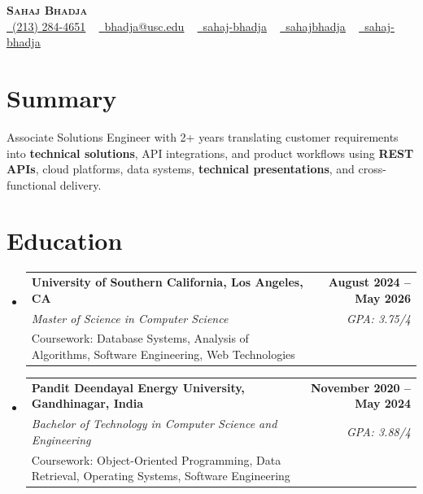 \documentclass[letterpaper,10pt]{article}
\makeatletter
\newcommand{\sectionGap}{\vspace{-8pt}}
\newcommand{\resumeEduSubheading}[5]{\vspace{-1pt}\item\begin{tabular*}{1.0\textwidth}[t]{l@{\extracolsep{\fill}}r}\textbf{#1} & \textbf{\small #2} \\\textit{\small #3} & \textit{\small #4} \\\small #5 & \\\end{tabular*}\vspace{-4pt}}
\newcommand{\resumeSubHeadingListStart}{\begin{itemize}[leftmargin=0.0in, label={}]}
\newcommand{\resumeSubHeadingListEnd}{\end{itemize}}
\makeatother
\begin{document}
\begin{center}
{\Huge \scshape \textbf{Sahaj Bhadja}} \\ \vspace{1pt}
\small \href{tel:2132844651}{\faPhone\ \underline{(213) 284-4651}} ~ \href{mailto:bhadja@usc.edu}{\raisebox{-0.2\height}\faEnvelope\ \underline{bhadja@usc.edu}} ~
\href{https://www.linkedin.com/in/sahaj-bhadja/}{\raisebox{-0.2\height}\faLinkedin\ \underline{sahaj-bhadja}} ~ \href{https://github.com/SAHAJ-BHADJA}{\raisebox{-0.2\height}\faGithub\ \underline{sahajbhadja}} ~
\href{https://sahaj-bhadja.vercel.app/}{\raisebox{-0.2\height}\faGlobe\ \underline{sahaj-bhadja}}
\end{center}
\vspace{-16pt}
\section{Summary}
\begin{itemize}[leftmargin=0.15in, label={}]
\small{\item{Associate Solutions Engineer with 2+ years translating customer requirements into \textbf{technical solutions}, API integrations, and product workflows using \textbf{REST APIs}, cloud platforms, data systems, \textbf{technical presentations}, and cross-functional delivery.}}
\end{itemize}
\sectionGap
\section{Education}
\resumeSubHeadingListStart
\resumeEduSubheading{University of Southern California, Los Angeles, CA}{August 2024 -- May 2026}{Master of Science in Computer Science}{GPA: 3.75/4}{Coursework: Database Systems, Analysis of Algorithms, Software Engineering, Web Technologies}
\resumeEduSubheading{Pandit Deendayal Energy University, Gandhinagar, India}{November 2020 -- May 2024}{Bachelor of Technology in Computer Science and Engineering}{GPA: 3.88/4}{Coursework: Object-Oriented Programming, Data Retrieval, Operating Systems, Software Engineering}
\resumeSubHeadingListEnd
\sectionGap
\end{document}
